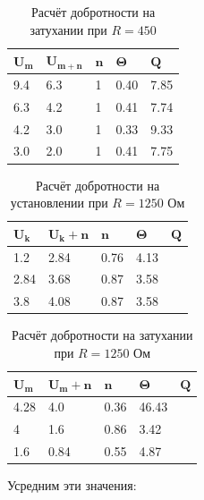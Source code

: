 \documentclass{lab}
\begin{document}
\begin{table}[h!]
    \centering
    \begin{tabular}{|l|l|l|l|l|}
        \hline
        $\mathbf{U_m}$ & $\mathbf{U_{m+n}}$ & $\mathbf{n}$ & $\mathbf{\Theta}$ & $\mathbf{Q}$ \\ \hline
        9.4 & 6.3 &  1           & 0.40                 & 7.85         \\ \hline
        6.3 & 4.2 &  1           & 0.41                 & 7.74         \\ \hline
        4.2 & 3.0 &  1           & 0.33                 & 9.33         \\ \hline
        3.0 & 2.0 & 1            & 0.41                 & 7.75         \\ \hline
    \end{tabular}
    \caption{Расчёт добротности на затухании при $R=450$}
\end{table}

\begin{table}[h!]
    \centering
    \begin{tabular}{|l|l|l|l|l|}
        \hline
        $\mathbf{U_k}$ & $\mathbf{U_k+n}$ & $\mathbf{n}$ & $\mathbf{\Theta}$ & $\mathbf{Q}$ \\ \hline
        1.2 & 2.84  & 0.76 & 4.13 & \\ \hline
        2.84 & 3.68 & 0.87 & 3.58 & \\ \hline
        3.8 & 4.08  & 0.87 & 3.58 & \\ \hline
    \end{tabular}
    \caption{Расчёт добротности на установлении при $R=1250$ Ом}
\end{table}

\begin{table}[h!]
    \centering
    \begin{tabular}{|l|l|l|l|l|}
        \hline
        $\mathbf{U_m}$ & $\mathbf{U_m+n}$ & $\mathbf{n}$ & $\mathbf{\Theta}$ & $\mathbf{Q}$ \\ \hline
        4.28 & 4.0  & 0.36 & 46.43  & \\ \hline
        4    & 1.6  & 0.86 & 3.42   & \\ \hline
        1.6  & 0.84 & 0.55 & 4.87   & \\ \hline
    \end{tabular}
    \caption{Расчёт добротности на затухании при $R=1250$ Ом}
\end{table}

Усредним эти значения:
\end{document}
